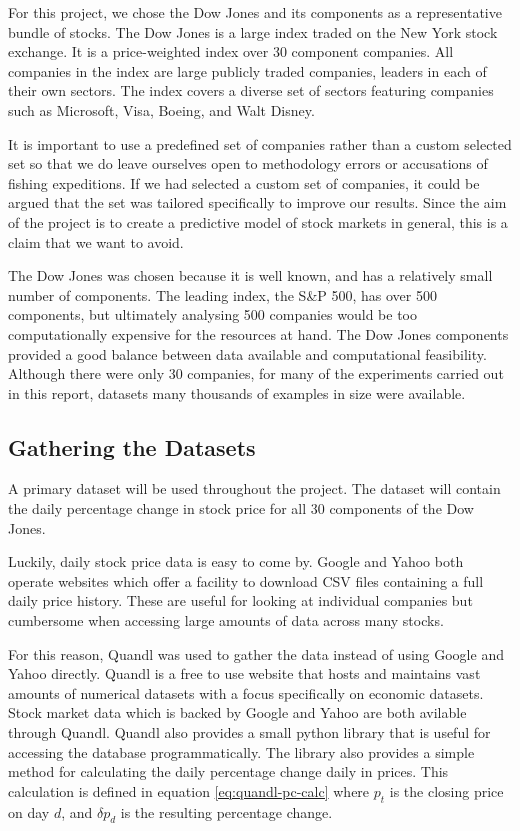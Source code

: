 \documentclass{report}
\begin{document}
For this project, we chose the Dow Jones and its components as a representative bundle of stocks. The Dow Jones is a large index traded on the New York stock exchange. It is a price-weighted index over 30 component companies. All companies in the index are large publicly traded companies, leaders in each of their own sectors. The index covers a diverse set of sectors featuring companies such as Microsoft, Visa, Boeing, and Walt Disney.

It is important to use a predefined set of companies rather than a custom selected set so that we do leave ourselves open to methodology errors or accusations of fishing expeditions. If we had selected a custom set of companies, it could be argued that the set was tailored specifically to improve our results. Since the aim of the project is to create a predictive model of stock markets in general, this is a claim that we want to avoid. 

The Dow Jones was chosen because it is well known, and has a relatively small number of components. The leading index, the S\&P 500, has over 500 components, but ultimately analysing 500 companies would be too computationally expensive for the resources at hand. The Dow Jones components provided a good balance between data available and computational feasibility. Although there were only 30 companies,  for many of the experiments carried out in this report, datasets many thousands of examples in size were available.

\subsection{Gathering the Datasets}

A primary dataset will be used throughout the project. The dataset will contain the daily percentage change in stock price for all 30 components of the Dow Jones.

Luckily, daily stock price data is easy to come by. Google and Yahoo both operate websites which offer a facility to download CSV files containing a full daily price history. These are useful for looking at individual companies but cumbersome when accessing large amounts of data across many stocks. 

For this reason, Quandl\cite{website:quandl} was used to gather the data instead of using Google and Yahoo directly. Quandl is a free to use website that hosts and maintains vast amounts of numerical datasets with a focus specifically on economic datasets. Stock market data which is backed by Google and Yahoo are both avilable through Quandl. Quandl also provides a small python library that is useful for accessing the database programmatically. The library also provides a simple method for calculating the daily percentage change daily in prices. This calculation is defined in equation \ref{eq:quandl-pc-calc} where $p_{t}$ is the closing price on day $d$, and $\delta p_{d}$ is the resulting percentage change.  
\end{document}
